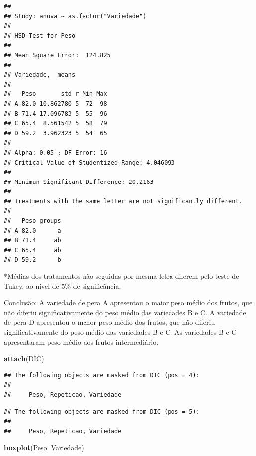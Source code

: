 \documentclass[12pt,brazil,]{book}
\newenvironment{Shaded}{\begin{snugshade}}{\end{snugshade}}
\newcommand{\KeywordTok}[1]{\textcolor[rgb]{0.13,0.29,0.53}{\textbf{#1}}}
\newcommand{\NormalTok}[1]{#1}
\newcommand{\OperatorTok}[1]{\textcolor[rgb]{0.81,0.36,0.00}{\textbf{#1}}}
\begin{document}
\begin{verbatim}
## 
## Study: anova ~ as.factor("Variedade")
## 
## HSD Test for Peso 
## 
## Mean Square Error:  124.825 
## 
## Variedade,  means
## 
##   Peso       std r Min Max
## A 82.0 10.862780 5  72  98
## B 71.4 17.096783 5  55  96
## C 65.4  8.561542 5  58  79
## D 59.2  3.962323 5  54  65
## 
## Alpha: 0.05 ; DF Error: 16 
## Critical Value of Studentized Range: 4.046093 
## 
## Minimun Significant Difference: 20.2163 
## 
## Treatments with the same letter are not significantly different.
## 
##   Peso groups
## A 82.0      a
## B 71.4     ab
## C 65.4     ab
## D 59.2      b
\end{verbatim}

*Médias dos tratamentos não seguidas por mesma letra diferem pelo teste
de Tukey, ao nível de 5\% de significância.

Conclusão: A variedade de pera A apresentou o maior peso médio dos
frutos, que não diferiu significativamente do peso médio das variedades
B e C. A variedade de pera D apresentou o menor peso médio dos frutos,
que não diferiu significativamente do peso médio das variedades B e C.
As variedades B e C apresentaram peso médio dos frutos intermediário.

\begin{Shaded}
\begin{Highlighting}[]
\KeywordTok{attach}\NormalTok{(DIC)}
\end{Highlighting}
\end{Shaded}

\begin{verbatim}
## The following objects are masked from DIC (pos = 4):
## 
##     Peso, Repeticao, Variedade
\end{verbatim}

\begin{verbatim}
## The following objects are masked from DIC (pos = 5):
## 
##     Peso, Repeticao, Variedade
\end{verbatim}

\begin{Shaded}
\begin{Highlighting}[]
\KeywordTok{boxplot}\NormalTok{(Peso}\OperatorTok{~}\NormalTok{Variedade)}
\end{Highlighting}
\end{Shaded}
\end{document}
